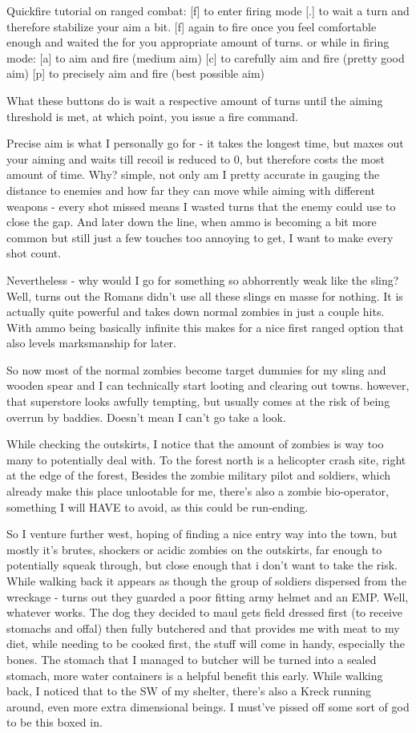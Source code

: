 \documentclass[11pt]{report}
\begin{document}
Quickfire tutorial on ranged combat:
[f] to enter firing mode
[.] to wait a turn and therefore stabilize your aim a bit.
[f] again to fire once you feel comfortable enough and waited the for you appropriate amount of turns.
or
while in firing mode:
[a] to aim and fire (medium aim)
[c] to carefully aim and fire (pretty good aim)
[p] to precisely aim and fire (best possible aim)

What these buttons do is wait a respective amount of turns until the aiming threshold is met, at which point, you issue a fire command.

Precise aim is what I personally go for - it takes the longest time, but maxes out your aiming and waits till recoil is reduced to 0, but therefore costs the most amount of time. Why? simple, not only am I pretty accurate in gauging the distance to enemies and how far they can move while aiming with different weapons - every shot missed means I wasted turns that the enemy could use to close the gap. And later down the line, when ammo is becoming a bit more common but still just a few touches too annoying to get, I want to make every shot count.

Nevertheless - why would I go for something so abhorrently weak like the sling? Well, turns out the Romans didn't use all these slings en masse for nothing. It is actually quite powerful and takes down normal zombies in just a couple hits. With ammo being basically infinite this makes for a nice first ranged option that also levels marksmanship for later.

So now most of the normal zombies become target dummies for my sling and wooden spear and I can technically start looting and clearing out towns. however, that superstore looks awfully tempting, but usually comes at the risk of being overrun by baddies. Doesn't mean I can't go take a look.

While checking the outskirts, I notice that the amount of zombies is way too many to potentially deal with. To the forest north is a helicopter crash site, right at the edge of the forest, Besides the zombie military pilot and soldiers, which already make this place unlootable for me, there's also a zombie bio-operator, something I will HAVE to avoid, as this could be run-ending.

So I venture further west, hoping of finding a nice entry way into the town, but mostly it's brutes, shockers or acidic zombies on the outskirts, far enough to potentially squeak through, but close enough that i don't want to take the risk. While walking back it appears as though the group of soldiers dispersed from the wreckage - turns out they guarded a poor fitting army helmet and an EMP. Well, whatever works. The dog they decided to maul gets field dressed first (to receive stomachs and offal) then fully butchered and that provides me with meat to my diet, while needing to be cooked first, the stuff will come in handy, especially the bones. The stomach that I managed to butcher will be turned into a sealed stomach, more water containers is a helpful benefit this early. While walking back, I noticed that to the SW of my shelter, there's also a Kreck running around, even more extra dimensional beings. I must've pissed off some sort of god to be this boxed in.
\end{document}
